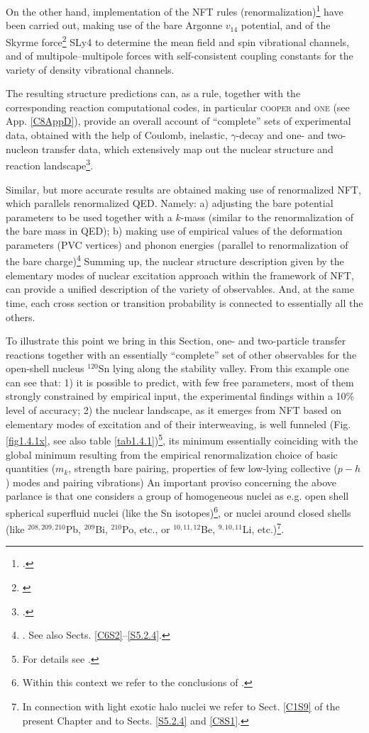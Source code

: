 On the other hand,  implementation of the NFT rules (renormalization)\footnote{\cite{Broglia:16}.} have been carried out, making use of the bare Argonne $v_{14}$ potential, and of the Skyrme  force\footnote{\cite{Chabanat:97}} SLy4 to determine the mean field and spin vibrational channels, and of multipole--multipole forces with self-consistent  coupling constants for the variety of density vibrational channels.


The resulting structure predictions can, as a rule,  together with the corresponding reaction computational codes, in particular \textsc{cooper} and \textsc{one} (see App. \ref{C8AppD}), provide an overall account of ``complete'' sets of experimental data, obtained with the help of Coulomb, inelastic, $\gamma$-decay  and one- and two-nucleon transfer data, which  extensively map out the nuclear structure and reaction landscape\footnote{\cite{Idini:15,Idini:14,Potel:13}.}.


 Similar, but more accurate results are obtained  making use of renormalized NFT, which parallels renormalized QED. Namely: a) adjusting the bare potential parameters to be used together with a $k$-mass (similar to the renormalization of the bare mass in QED); b) making use of empirical values of the deformation parameters (PVC vertices) and phonon energies (parallel to renormalization of the bare charge)\footnote{\cite{Barranco:17,Barranco:20}. See also Sects. \ref{C6S2}--\ref{S5.2.4}.}
 Summing up, the nuclear structure description given by the elementary modes of nuclear excitation approach within the framework of NFT, can provide a unified description of the variety of observables. And, at the same time, each cross section or transition probability is connected to essentially all the others.


To illustrate this point we  bring   in this Section,  one- and two-particle transfer reactions together with an essentially ``complete'' set of other  observables  for the open-shell nucleus $^{120}$Sn lying  along the stability valley. From this example one can see that: 1) it is possible to predict, with few free parameters, most of them strongly constrained by empirical input, the experimental findings within a 10\% level of accuracy; 2) the nuclear landscape, as it emerges from NFT based on elementary modes of excitation and of their interweaving, is well funneled (Fig. \ref{fig1.4.1x}, see also table \ref{tab1.4.1})\footnote{For details see \cite{Idini:15}.}, its minimum essentially coinciding with the global minimum resulting from the empirical renormalization choice of basic quantities ($m_k$, strength bare pairing, properties of few low-lying collective ($p-h$) modes  and pairing vibrations) An important proviso concerning the above parlance is that one considers a group of homogeneous nuclei as e.g. open shell spherical superfluid nuclei (like the Sn isotopes)\footnote{Within this context we refer to the conclusions of \cite{Idini:15}.}, or nuclei around closed shells (like $^{208,209,210}$Pb, $^{209}$Bi, $^{210}$Po, etc., or $^{10,11,12}$Be, $^{9,10,11}$Li, etc.)\footnote{In connection with light exotic halo nuclei we refer to Sect. \ref{C1S9} of the present Chapter and to Sects. \ref{S5.2.4} and \ref{C8S1}.}. 



